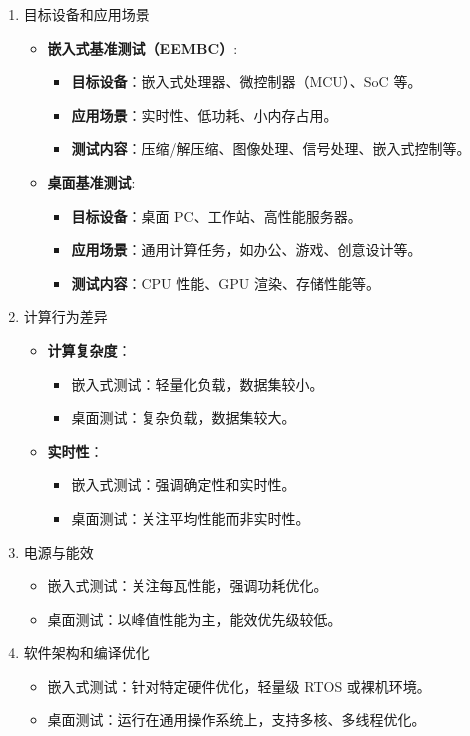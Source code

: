 \documentclass[UTF8]{report}
\begin{document}
\begin{enumerate}
    \item 目标设备和应用场景
    \begin{itemize}
        \item \textbf{嵌入式基准测试（EEMBC）}:
        \begin{itemize}
            \item \textbf{目标设备}：嵌入式处理器、微控制器（MCU）、SoC 等。
            \item \textbf{应用场景}：实时性、低功耗、小内存占用。
            \item \textbf{测试内容}：压缩/解压缩、图像处理、信号处理、嵌入式控制等。
        \end{itemize}
        \item \textbf{桌面基准测试}:
        \begin{itemize}
            \item \textbf{目标设备}：桌面 PC、工作站、高性能服务器。
            \item \textbf{应用场景}：通用计算任务，如办公、游戏、创意设计等。
            \item \textbf{测试内容}：CPU 性能、GPU 渲染、存储性能等。
        \end{itemize}
    \end{itemize}
    
    \item 计算行为差异
    \begin{itemize}
        \item \textbf{计算复杂度}：
        \begin{itemize}
            \item 嵌入式测试：轻量化负载，数据集较小。
            \item 桌面测试：复杂负载，数据集较大。
        \end{itemize}
        \item \textbf{实时性}：
        \begin{itemize}
            \item 嵌入式测试：强调确定性和实时性。
            \item 桌面测试：关注平均性能而非实时性。
        \end{itemize}
    \end{itemize}

    \item 电源与能效
    \begin{itemize}
        \item 嵌入式测试：关注每瓦性能，强调功耗优化。
        \item 桌面测试：以峰值性能为主，能效优先级较低。
    \end{itemize}

    \item 软件架构和编译优化
    \begin{itemize}
        \item 嵌入式测试：针对特定硬件优化，轻量级 RTOS 或裸机环境。
        \item 桌面测试：运行在通用操作系统上，支持多核、多线程优化。
    \end{itemize}
\end{enumerate}
\end{document}
